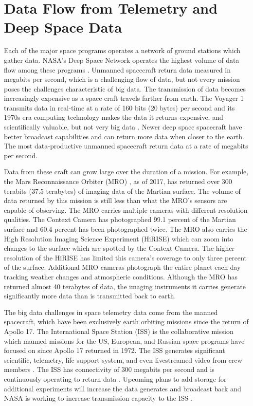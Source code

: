 \documentclass[sigconf]{acmart}
\begin{document}
\section{Data Flow from Telemetry and Deep Space Data}
Each of the major space programs operates a network of ground stations which gather data. NASA's Deep Space Network operates the highest volume of data flow among these programs \cite{AndrewODea2013}. Unmanned spacecraft return data measured in megabits per second, which is a challenging flow of data, but not every mission poses the challenges characteristic of big data. The transmission of data becomes increasingly expensive as a space craft travels farther from earth. The Voyager 1 transmits data in real-time at a rate of 160 bits (20 bytes) per second and its 1970s era computing technology makes the data it returns expensive, and scientifically valuable, but not very big data \cite{Laboratory2017}. Newer deep space spacecraft have better broadcast capabilities and can return more data when closer to the earth. The most data-productive unmanned spacecraft return data at a rate of megabits per second.

Data from these craft can grow large over the duration of a mission. For example, the Mars Reconnaissance Orbiter (MRO) \cite{Parnell2017}, as of 2017, has returned over 300 terabits \cite{Laboratory2017a} (37.5 terabytes) of imaging data of the Martian surface. The volume of data returned by this mission is still less than what the MRO's sensors are capable of observing. The MRO carries multiple cameras with different resolution qualities. The Context Camera \cite{Laboratory2017a} has photographed 99.1 percent of the Martian surface and 60.4 percent  has been photographed twice. The MRO also carries the High Resolution Imaging Science Experiment (HiRISE) \cite{Parnell2017} which can zoom into changes to the surface which are spotted by the Context Camera. The higher resolution of the HiRISE has limited this camera's coverage to only three percent of the surface. Additional MRO cameras photograph the entire planet each day tracking weather changes and atmospheric conditions. Although the MRO has returned almost 40 terabytes of data, the imaging instruments it carries generate significantly more data than is transmitted back to earth. 


The big data challenges in space telemetry data come from the manned spacecraft, which have been exclusively earth orbiting missions since the return of Apollo 17. The International Space Station (ISS) is the collaborative mission which manned missions for the US, European, and Russian space programs have focused on since Apollo 17 returned in 1972. The ISS generates significant scientific, telemetry, life support system, and even livestreamed video from crew members \cite{Betts2017}. The ISS has connectivity of 300 megabits per second and is continuously operating to return data \cite{Deb2001}. Upcoming plans to add storage for additional experiments will increase the data generates and broadcast back and NASA is working to increase transmission capacity to the ISS \cite{Deb2001}. 
\end{document}
